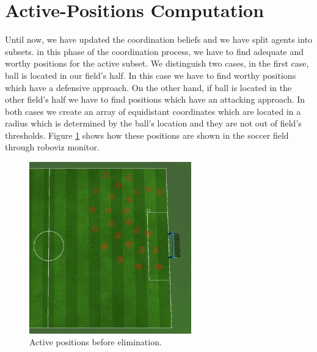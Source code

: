 \section{Active-Positions Computation}
Until now, we have updated the coordination beliefs and we have split agents into subsets. in this phase of the coordination process, we have to find adequate and worthy positions for the active subset. We distinguish two cases, in the first case, ball is located in our field's half. In this case we have to find worthy positions which have a defensive approach. On the other hand, if ball is located in the other field's half we have to find positions which have an attacking approach. In both cases we create an array of equidistant coordinates which are located in a radius which is determined by the ball's location and they are not out of field's thresholds. Figure \ref{fig:ActivePositions2} shows how these positions are shown in the soccer field through roboviz monitor. 
\begin{figure}[htb!]
\centering
  \includegraphics[width=7cm]{Chapter4/figures/ActivePositions2.png}
  \caption{Active positions before elimination.} 
  \label{fig:ActivePositions2}
\end{figure}

